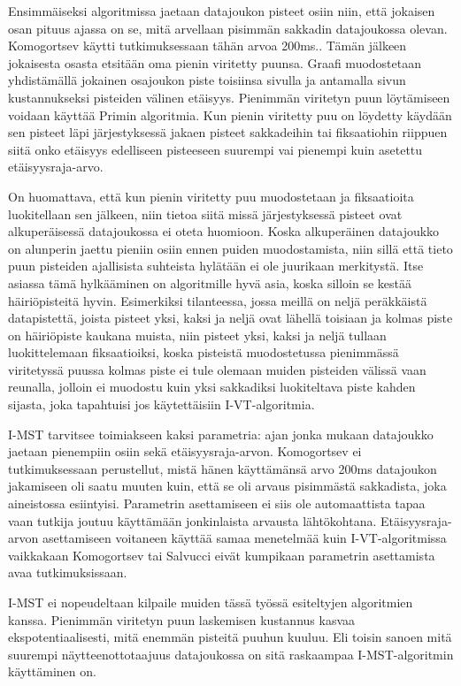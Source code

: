 Ensimmäiseksi algoritmissa jaetaan datajoukon pisteet osiin niin, että jokaisen osan pituus ajassa on se, mitä arvellaan pisimmän sakkadin datajoukossa olevan. Komogortsev käytti tutkimuksessaan tähän arvoa 200ms.\citep[s. 3 ]{komogortsev2010}. Tämän jälkeen jokaisesta osasta etsitään oma pienin viritetty puunsa. Graafi muodostetaan yhdistämällä jokainen osajoukon piste toisiinsa sivulla ja antamalla sivun kustannukseksi pisteiden välinen etäisyys. Pienimmän viritetyn puun löytämiseen voidaan käyttää Primin algoritmia.\citep[s. 75]{salvucci2000} Kun pienin viritetty puu on löydetty käydään sen pisteet läpi järjestyksessä jakaen pisteet sakkadeihin tai fiksaatiohin riippuen siitä onko etäisyys edelliseen pisteeseen suurempi vai pienempi kuin asetettu etäisyysraja-arvo.

On huomattava, että kun pienin viritetty puu muodostetaan ja fiksaatioita luokitellaan sen jälkeen, niin tietoa siitä missä järjestyksessä pisteet ovat alkuperäisessä datajoukossa ei oteta huomioon. Koska alkuperäinen datajoukko on alunperin jaettu pieniin osiin ennen puiden muodostamista, niin sillä että tieto puun pisteiden ajallisista suhteista hylätään ei ole juurikaan merkitystä. Itse asiassa tämä hylkääminen on algoritmille hyvä asia, koska silloin se kestää häiriöpisteitä hyvin. Esimerkiksi tilanteessa, jossa meillä on neljä peräkkäistä datapistettä, joista pisteet yksi, kaksi ja neljä ovat lähellä toisiaan ja kolmas piste on häiriöpiste kaukana muista, niin pisteet yksi, kaksi ja neljä tullaan luokittelemaan fiksaatioiksi, koska pisteistä muodostetussa pienimmässä viritetyssä puussa kolmas piste ei tule olemaan muiden pisteiden välissä vaan reunalla, jolloin ei muodostu kuin yksi sakkadiksi luokiteltava piste kahden sijasta, joka tapahtuisi jos käytettäisiin I-VT-algoritmia.

I-MST tarvitsee toimiakseen kaksi parametria: ajan jonka mukaan datajoukko jaetaan pienempiin osiin sekä etäisyysraja-arvon. Komogortsev ei tutkimuksessaan perustellut, mistä hänen käyttämänsä arvo 200ms datajoukon jakamiseen oli saatu muuten kuin, että se oli arvaus pisimmästä sakkadista, joka aineistossa esiintyisi. Parametrin asettamiseen ei siis ole automaattista tapaa vaan tutkija joutuu käyttämään jonkinlaista arvausta lähtökohtana. Etäisyysraja-arvon asettamiseen voitaneen käyttää samaa menetelmää kuin I-VT-algoritmissa vaikkakaan Komogortsev tai Salvucci eivät kumpikaan parametrin asettamista avaa tutkimuksissaan.

I-MST ei nopeudeltaan kilpaile muiden tässä työssä esiteltyjen algoritmien kanssa. Pienimmän viritetyn puun laskemisen kustannus kasvaa ekspotentiaalisesti, mitä enemmän pisteitä puuhun kuuluu. Eli toisin sanoen mitä suurempi näytteenottotaajuus datajoukossa on sitä raskaampaa I-MST-algoritmin käyttäminen on. 


